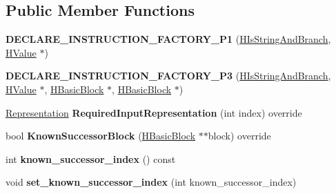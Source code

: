 \subsection*{Public Member Functions}
\begin{DoxyCompactItemize}
\item 
{\bfseries D\+E\+C\+L\+A\+R\+E\+\_\+\+I\+N\+S\+T\+R\+U\+C\+T\+I\+O\+N\+\_\+\+F\+A\+C\+T\+O\+R\+Y\+\_\+\+P1} (\hyperlink{classv8_1_1internal_1_1_h_is_string_and_branch}{H\+Is\+String\+And\+Branch}, \hyperlink{classv8_1_1internal_1_1_h_value}{H\+Value} $\ast$)\hypertarget{classv8_1_1internal_1_1_h_is_string_and_branch_a728ad2f4c5fc10251c72e4afa3cf7dbc}{}\label{classv8_1_1internal_1_1_h_is_string_and_branch_a728ad2f4c5fc10251c72e4afa3cf7dbc}

\item 
{\bfseries D\+E\+C\+L\+A\+R\+E\+\_\+\+I\+N\+S\+T\+R\+U\+C\+T\+I\+O\+N\+\_\+\+F\+A\+C\+T\+O\+R\+Y\+\_\+\+P3} (\hyperlink{classv8_1_1internal_1_1_h_is_string_and_branch}{H\+Is\+String\+And\+Branch}, \hyperlink{classv8_1_1internal_1_1_h_value}{H\+Value} $\ast$, \hyperlink{classv8_1_1internal_1_1_h_basic_block}{H\+Basic\+Block} $\ast$, \hyperlink{classv8_1_1internal_1_1_h_basic_block}{H\+Basic\+Block} $\ast$)\hypertarget{classv8_1_1internal_1_1_h_is_string_and_branch_acb1e009b7a05f10d3f7c40ce88beb64e}{}\label{classv8_1_1internal_1_1_h_is_string_and_branch_acb1e009b7a05f10d3f7c40ce88beb64e}

\item 
\hyperlink{classv8_1_1internal_1_1_representation}{Representation} {\bfseries Required\+Input\+Representation} (int index) override\hypertarget{classv8_1_1internal_1_1_h_is_string_and_branch_a0d33488a5e01d8c620c82ae1ae018b8a}{}\label{classv8_1_1internal_1_1_h_is_string_and_branch_a0d33488a5e01d8c620c82ae1ae018b8a}

\item 
bool {\bfseries Known\+Successor\+Block} (\hyperlink{classv8_1_1internal_1_1_h_basic_block}{H\+Basic\+Block} $\ast$$\ast$block) override\hypertarget{classv8_1_1internal_1_1_h_is_string_and_branch_a880f7d5b13e8631bc68d8c79d64518a6}{}\label{classv8_1_1internal_1_1_h_is_string_and_branch_a880f7d5b13e8631bc68d8c79d64518a6}

\item 
int {\bfseries known\+\_\+successor\+\_\+index} () const \hypertarget{classv8_1_1internal_1_1_h_is_string_and_branch_a9458e6192cbe361d6e544bc098e63bcf}{}\label{classv8_1_1internal_1_1_h_is_string_and_branch_a9458e6192cbe361d6e544bc098e63bcf}

\item 
void {\bfseries set\+\_\+known\+\_\+successor\+\_\+index} (int known\+\_\+successor\+\_\+index)\hypertarget{classv8_1_1internal_1_1_h_is_string_and_branch_a99e03a41ffa574cde0b8b88b8f67b894}{}\label{classv8_1_1internal_1_1_h_is_string_and_branch_a99e03a41ffa574cde0b8b88b8f67b894}

\end{DoxyCompactItemize}
